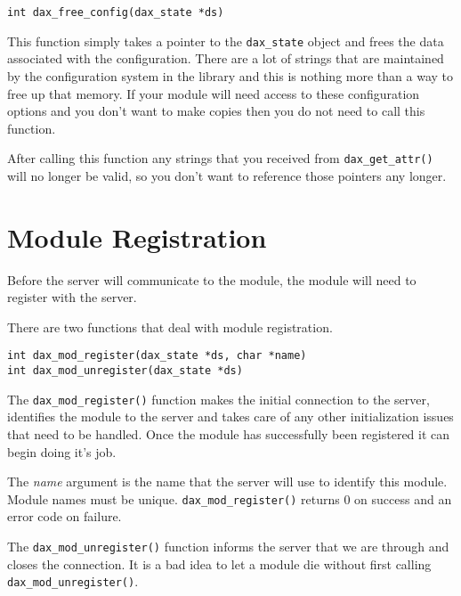 \begin{verbatim}
int dax_free_config(dax_state *ds)
\end{verbatim}

This function simply takes a pointer to the \verb|dax_state| object and frees the data associated with the configuration.  There are a lot of strings that are maintained by the configuration system in the library and this is nothing more than a way to free up that memory.  If your module will need access to these configuration options and you don't want to make copies then you do not need to call this function.

After calling this function any strings that you received from \verb|dax_get_attr()| will no longer be valid, so you don't want to reference those pointers any longer.

\section{Module Registration}
Before the server will communicate to the module, the module will need to register with the server.

There are two functions that deal with module registration.
\begin{verbatim}
int dax_mod_register(dax_state *ds, char *name)
int dax_mod_unregister(dax_state *ds)
\end{verbatim}

The \verb|dax_mod_register()| function makes the initial connection to the server, identifies the module to the server and takes care of any other initialization issues that need to be handled.  Once the module has successfully been registered it can begin doing it's job.

The \emph{name} argument is the name that the server will use to identify this module.  Module names must be unique.  \verb|dax_mod_register()| returns 0 on success and an error code on failure.

The \verb|dax_mod_unregister()| function informs the server that we are through and closes the connection.  It is a bad idea to let a module die without first calling \verb|dax_mod_unregister()|.
